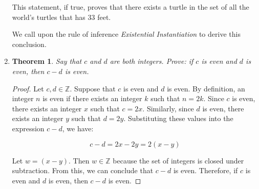 \documentclass{article}
\newtheorem{theorem}{Theorem}
\begin{document}
\begin{enumerate}
          This statement, if true, proves that there exists a turtle in the set of all
          the world's turtles that has $33$ feet.

          We call upon the rule of inference \textit{Existential Instantiation} to derive
          this conclusion.

          \newpage

    \item \begin{theorem}
              Say that $c$ and $d$ are both integers. Prove: if $c$ is even and $d$ is even,
              then $c-d$ is even.
          \end{theorem}

          \begin{proof}
              Let $c, d \in \mathbb{Z}$. Suppose that $c$ is even and $d$ is even. By definition,
              an integer $n$ is even if there exists an integer $k$ such that $n = 2k$. Since $c$ is
              even, there exists an integer $x$ such that $c = 2x$. Similarly, since $d$ is even,
              there exists an integer $y$ such that $d = 2y$. Substituting these values into the
              expression $c - d$, we have:

              \[c - d = 2x - 2y = 2(x - y)\]

              Let $w = (x - y)$. Then $w \in \mathbb{Z}$ because the set of integers is
              closed under subtraction. From this, we can conclude that $c - d$ is even.
              Therefore, if $c$ is even and $d$ is even, then $c - d$ is even.
          \end{proof}

\end{enumerate}
\end{document}
